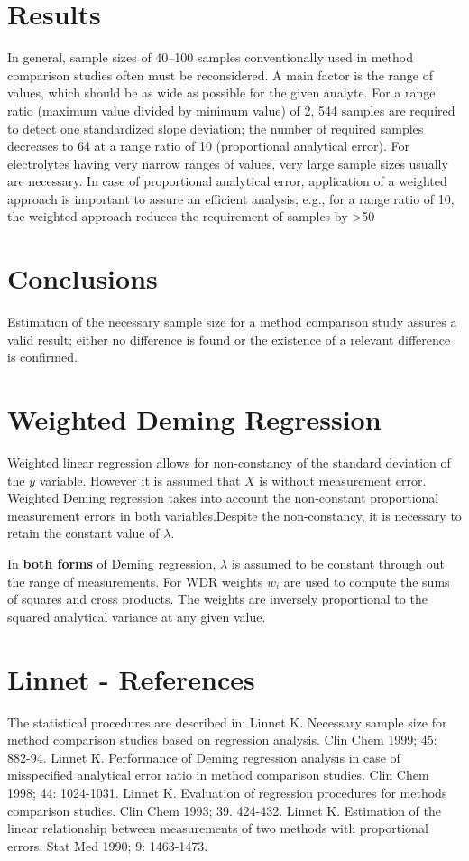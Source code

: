 \documentclass[12pt, a4paper]{report}
\theoremstyle{plain}
\theoremstyle{definition}
\theoremstyle{remark}
\begin{document}
\section{Results} In general, sample sizes of 40–100 samples conventionally used in method comparison studies often must 
be reconsidered. A main factor is the range of values, which should be as wide as possible for the given analyte. 
For a range ratio (maximum value divided by minimum value) of 2, 544 samples are required to detect one standardized slope 
deviation; the number of required samples decreases to 64 at a range ratio of 10 (proportional analytical error). For electrolytes having very narrow ranges of values, very large sample sizes usually are necessary. In case of proportional analytical error, application of a weighted approach is important to assure an efficient analysis; e.g., for a range ratio of 10, the weighted approach reduces the requirement of samples by >50%

\section{Conclusions} Estimation of the necessary sample size for a method comparison study assures a valid result; either no difference is found or the existence of a relevant difference is confirmed.






\section{Weighted Deming Regression}
Weighted linear regression allows for non-constancy of the standard deviation of the $y$ variable. However it is assumed that $X$ is without measurement error. Weighted Deming regression takes into account the non-constant proportional measurement errors in both variables.Despite the non-constancy, it is necessary to retain the constant value of $\lambda$.

In \textbf{both forms} of Deming regression, $\lambda$ is assumed to be constant through out the range of measurements. For WDR weights $w_{i}$ are used to compute the sums of squares and cross products. The weights are inversely proportional to the squared analytical variance at any given value.




\section{Linnet - References}
The statistical procedures are described in:
Linnet K. Necessary sample size for method comparison studies based on regression analysis. Clin Chem 1999; 45: 882-94.
Linnet K. Performance of Deming regression analysis in case of misspecified analytical error ratio in method comparison studies. Clin Chem 1998; 44: 1024-1031.
Linnet K. Evaluation of regression procedures for methods comparison studies. Clin Chem 1993; 39. 424-432.
Linnet K. Estimation of the linear relationship between measurements of two methods with proportional errors. Stat Med 1990; 9: 1463-1473.
\end{document}
